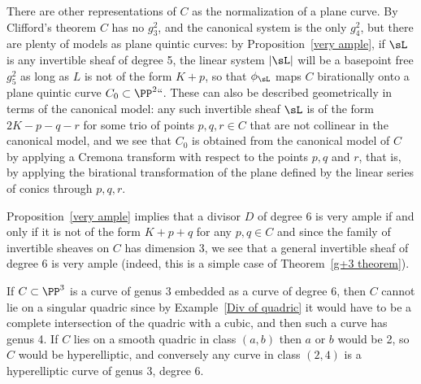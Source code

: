 There are other representations of $C$ as the normalization of a plane
curve. By
Clifford's theorem
%
 $C$ has no $g^2_3$, and the canonical system
is the only $g^2_4$, but there are plenty of models as plane
quintic curves:
%
by Proposition~\ref{very ample}, if $\sL$ is any invertible sheaf
of degree 5, the linear system $|\sL|$ will be a basepoint free $g^2_5$
as long as $L$ is not of the form $K+p$, so that $\phi_\sL$ maps $C$
birationally
%
onto a
plane quintic curve
%
$C_0 \subset \PP^2` `$. These can
also be described geometrically in terms of the canonical model: any
such invertible sheaf $\sL$ is of the form $2K-p-q-r$ for some trio of
points $p, q, r \in C$ that are not collinear in the
canonical model,
%
and we see  that $C_0$ is obtained from the canonical model of $C$ by
applying a
Cremona transform
%
with respect to the points $p, q$ and $r$,
that is, by applying the birational transformation
of the plane defined by the linear series of conics through $p,q,r$.

Proposition~\ref{very ample} implies that a divisor $D$ of degree 6 is
very ample if and only if it is not of the form $K+p+q$ for any $p, q
\in C$ and since the family of invertible sheaves on $C$ has dimension 3,
we see that a general invertible sheaf of degree 6 is very ample (indeed,
this is a simple case of Theorem~\ref{g+3 theorem}).

If $C\subset \PP^3$ is a curve of genus 3 embedded as a curve of degree
6, then $C$ cannot lie on a singular quadric since by
Example~\ref{Div of quadric} it would
have to be a complete intersection of the quadric with a cubic, and then
such a curve has genus 4. If $C$ lies on a smooth quadric
in class $(a,b)$ then $a$ or $b$ would be 2, so $C$ would be
hyperelliptic, and conversely any curve in class $(2,4)$
is a hyperelliptic curve of genus 3, degree 6.

